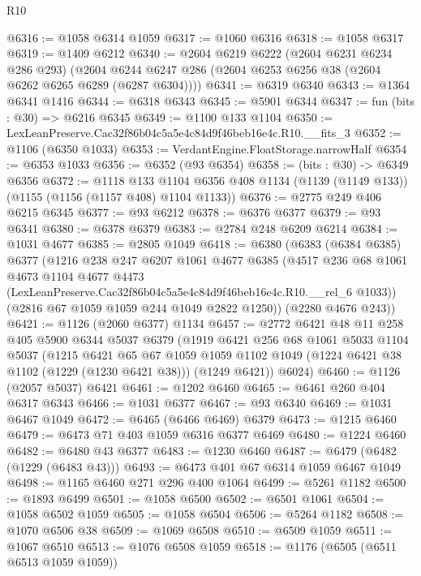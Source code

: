 \begin{lexlean}{R10}
\begin{coremodule}
@6316 := @1058 @6314 @1059
@6317 := @1060 @6316
@6318 := @1058 @6317
@6319 := @1409 @6212
@6340 := @2604
    @6219
    @6222
    (@2604 @6231 @6234 @286 @293)
    (@2604 @6244 @6247 @286 (@2604 @6253 @6256 @38 (@2604 @6262 @6265 @6289 (@6287 @6304))))
@6341 := @6319 @6340
@6343 := @1364 @6341 @1416
@6344 := @6318 @6343
@6345 := @5901 @6344
@6347 := fun (bits : @30) => @6216 @6345
@6349 := @1100 @133 @1104
@6350 := LexLeanPreserve.Cac32f86b04c5a5e4c84d9f46beb16e4c.R10.__fits_3
@6352 := @1106 (@6350 @1033)
@6353 := VerdantEngine.FloatStorage.narrowHalf
@6354 := @6353 @1033
@6356 := @6352 (@93 @6354)
@6358 := (bits : @30) -> @6349 @6356
@6372 := @1118
    @133
    @1104
    @6356
    @408
    @1134
    (@1139 (@1149 @133))
    (@1155 (@1156 (@1157 @408) @1104 @1133))
@6376 := @2775 @249 @406 @6215 @6345
@6377 := @93 @6212
@6378 := @6376 @6377
@6379 := @93 @6341
@6380 := @6378 @6379
@6383 := @2784 @248 @6209 @6214
@6384 := @1031 @4677
@6385 := @2805 @1049
@6418 := @6380
    (@6383
      (@6384 @6385)
      @6377
      (@1216
        @238
        @247
        @6207
        @1061
        @4677
        @6385
        (@4517
          @236
          @68
          @1061
          @4673
          @1104
          @4677
          @4473
          (LexLeanPreserve.Cac32f86b04c5a5e4c84d9f46beb16e4c.R10.__rel_6 @1033))
        (@2816 @67 @1059 @1059 @244 @1049 @2822 @1250))
      (@2280 @4676 @243))
@6421 := @1126 (@2060 @6377) @1134
@6457 := @2772
    @6421
    @48
    @11
    @258
    @405
    @5900
    @6344
    @5037
    @6379
    (@1919
      @6421
      @256
      @68
      @1061
      @5033
      @1104
      @5037
      (@1215
        @6421
        @65
        @67
        @1059
        @1059
        @1102
        @1049
        (@1224 @6421 @38 @1102 (@1229 (@1230 @6421 @38)))
        (@1249 @6421))
      @6024)
@6460 := @1126 (@2057 @5037) @6421
@6461 := @1202 @6460
@6465 := @6461 @260 @404 @6317 @6343
@6466 := @1031 @6377
@6467 := @93 @6340
@6469 := @1031 @6467 @1049
@6472 := @6465 (@6466 @6469) @6379
@6473 := @1215 @6460
@6479 := @6473 @71 @403 @1059 @6316 @6377 @6469
@6480 := @1224 @6460
@6482 := @6480 @43 @6377
@6483 := @1230 @6460
@6487 := @6479 (@6482 (@1229 (@6483 @43)))
@6493 := @6473 @401 @67 @6314 @1059 @6467 @1049
@6498 := @1165 @6460 @271 @296 @400 @1064
@6499 := @5261 @1182
@6500 := @1893 @6499
@6501 := @1058 @6500
@6502 := @6501 @1061
@6504 := @1058 @6502 @1059
@6505 := @1058 @6504
@6506 := @5264 @1182
@6508 := @1070 @6506 @38
@6509 := @1069 @6508
@6510 := @6509 @1059
@6511 := @1067 @6510
@6513 := @1076 @6508 @1059
@6518 := @1176 (@6505 (@6511 @6513 @1059 @1059))

\end{coremodule}
\end{lexlean}
